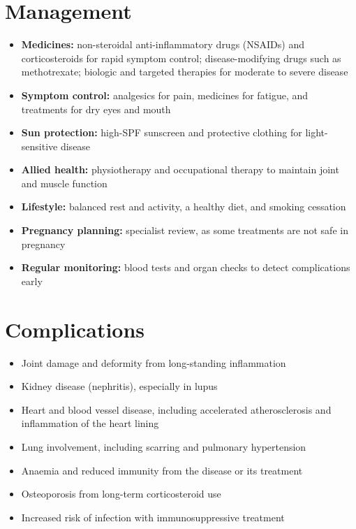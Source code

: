 \section*{Management}
\begin{itemize}
    \item \textbf{Medicines:} non-steroidal anti-inflammatory drugs (NSAIDs) and corticosteroids for rapid symptom control; disease-modifying drugs such as methotrexate; biologic and targeted therapies for moderate to severe disease
    \item \textbf{Symptom control:} analgesics for pain, medicines for fatigue, and treatments for dry eyes and mouth
    \item \textbf{Sun protection:} high-SPF sunscreen and protective clothing for light-sensitive disease
    \item \textbf{Allied health:} physiotherapy and occupational therapy to maintain joint and muscle function
    \item \textbf{Lifestyle:} balanced rest and activity, a healthy diet, and smoking cessation
    \item \textbf{Pregnancy planning:} specialist review, as some treatments are not safe in pregnancy
    \item \textbf{Regular monitoring:} blood tests and organ checks to detect complications early
\end{itemize}

\section*{Complications}
\begin{itemize}
    \item Joint damage and deformity from long-standing inflammation
    \item Kidney disease (nephritis), especially in lupus
    \item Heart and blood vessel disease, including accelerated atherosclerosis and inflammation of the heart lining
    \item Lung involvement, including scarring and pulmonary hypertension
    \item Anaemia and reduced immunity from the disease or its treatment
    \item Osteoporosis from long-term corticosteroid use
    \item Increased risk of infection with immunosuppressive treatment
\end{itemize}

